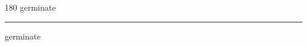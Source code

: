 
\begin{frame}
\begin{center}
\begin{turn}{180}
{\fontsize{2.5cm}{1em}\selectfont germinate}
\end{turn}
\vspace{1em}\par  
\hrule
\vspace{1em}\par  
{\fontsize{2.5cm}{1em}\selectfont germinate}
\end{center}
\end{frame}
